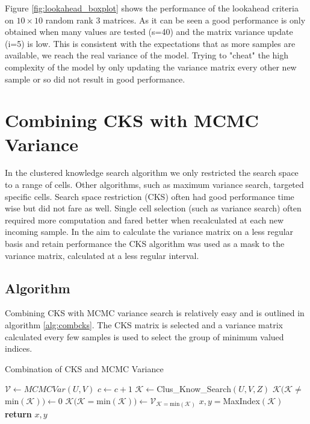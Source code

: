 Figure \ref{fig:lookahead_boxplot} shows the performance of the lookahead criteria on $10\times 10$ random rank 3 matrices. As it can be seen a good performance is only obtained when many values are tested (s=40) and the matrix variance update (i=5) is low. This is consistent with the expectations that as more samples are available, we reach the real variance of the model. Trying to "cheat" the high complexity of the model by only updating the variance matrix every other new sample or so did not result in good performance.


\section{Combining CKS with MCMC Variance}

In the clustered knowledge search algorithm we only restricted the search space to a range of cells. Other algorithms, such as maximum variance search, targeted specific cells. Search space restriction (CKS) often had good performance time wise but did not fare as well. Single cell selection (such as variance search) often required more computation and fared better when recalculated at each new incoming sample. In the aim to calculate the variance matrix on a less regular basis and retain performance the CKS algorithm was used as a mask to the variance matrix, calculated at a less regular interval.

\subsection{Algorithm}
Combining CKS with MCMC variance search is relatively easy and is outlined in algorithm \ref{alg:combcks}. The CKS matrix is selected and a variance matrix calculated every few samples is used to select the group of minimum valued indices.
\begin{algorithm}
\caption{Combination of CKS and MCMC Variance}\label{alg:combcks}
\begin{algorithmic}[1]
 
 
\State $\mathcal{V} \gets MCMCVar(U,V)$ 
\EndIf
\State $c \gets c + 1$
\State $\mathcal{K} \gets $Clus\_Know\_Search$(U,V,Z)$ 
\State $\mathcal{K}(\mathcal{K}\neq $min$(\mathcal{K})) \gets 0$ 
\State $\mathcal{K}(\mathcal{K} = $min$(\mathcal{K})) \gets \mathcal{V}_{\mathcal{K} = \text{min}(\mathcal{K})}$ 
\State $x,y = $MaxIndex$(\mathcal{K})$
\State \textbf{return} $x,y$ 
\EndProcedure
\end{algorithmic}
\end{algorithm}

